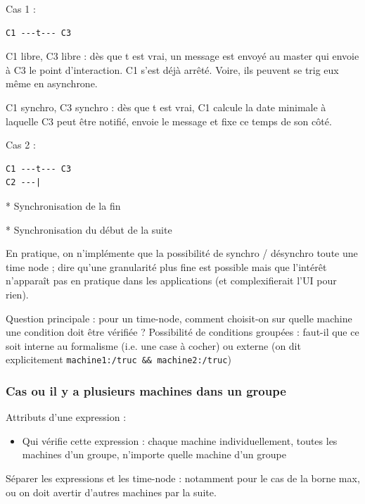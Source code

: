 \documentclass{article}
\newcommand\trigger{point d'interaction\xspace}
\begin{document}
Cas 1 : 
\begin{lstlisting}
C1 ---t--- C3
\end{lstlisting}
C1 libre, C3 libre : dès que t est vrai, un message est envoyé au master qui envoie à C3 le \trigger. C1 s'est déjà arrêté.
Voire, ils peuvent se trig eux même en asynchrone.

C1 synchro, C3 synchro : dès que t est vrai, C1 calcule la date minimale à laquelle C3 peut être notifié, envoie le message et fixe ce temps de son côté.

Cas 2 : 
\begin{lstlisting}
C1 ---t--- C3
C2 ---|
\end{lstlisting}

* Synchronisation de la fin

* Synchronisation du début de la suite

En pratique, on n'implémente que la possibilité de synchro / désynchro toute une time node ; dire qu'une granularité plus fine est possible mais que l'intérêt n'apparaît pas en pratique dans les applications (et complexifierait l'UI pour rien).

Question principale : pour un time-node, comment choisit-on sur quelle machine une condition doit être vérifiée ? Possibilité de conditions groupées : faut-il que ce soit interne au formalisme (i.e. une case à cocher) ou externe (on dit explicitement \lstinline|machine1:/truc && machine2:/truc|)

\subsubsection{Cas ou il y a plusieurs machines dans un groupe}
Attributs d'une expression : 
\begin{itemize}
    \item Qui vérifie cette expression : chaque machine individuellement, toutes les machines d'un groupe, n'importe quelle machine d'un groupe 
\end{itemize}

Séparer les expressions et les time-node : notamment pour le cas de la borne max, ou on doit avertir d'autres machines par la suite.
\end{document}
